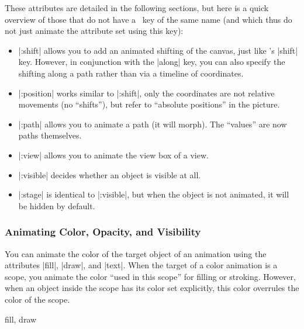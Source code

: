 These attributes are detailed in the following sections, but here is a
quick overview of those that do not have a \tikzname\ key of the same
name (and which thus do not just animate the attribute set using this
key):  
\begin{itemize}
\item |:shift| allows you to add an animated shifting of the
  canvas, just like \tikzname's |shift| key. However, in conjunction
  with the |along| key, you can also specify the shifting along a path
  rather than via a timeline of coordinates.
\item |:position| works similar to |:shift|, only the coordinates are
  not relative movements (no ``shifts''), but refer to ``absolute
  positions'' in the picture.
\item |:path| allows you to animate a path (it will
  morph). The ``values'' are now paths themselves. 
\item |:view| allows you to animate the view box of a view.
\item |:visible| decides whether  an object is visible at all. 
\item |:stage| is identical to |:visible|, but when the object is not
  animated, it will be hidden by default.
\end{itemize}



\subsubsection{Animating Color, Opacity, and Visibility}
\label{section-animation-painting}

You can animate the color of the target object of an animation using
the attributes |fill|, |draw|, and |text|. When the target of a color
animation is a scope, you animate the color ``used in this scope'' for
filling or stroking. However, when an object inside the scope has its
color set explicitly, this color overrules the color of the scope.

\begin{tikzanimateattribute}{fill, draw}
\begin{codeexample}[animation list={0.5,1,1.5,2}]
\end{codeexample}
\end{tikzanimateattribute}

